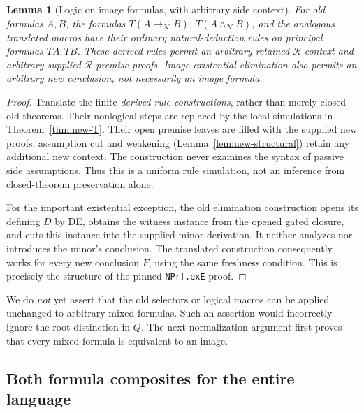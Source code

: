 \documentclass[11pt,a4paper]{article}
\newtheorem{lemma}[theorem]{Lemma}
\theoremstyle{definition}
\begin{document}
\begin{lemma}[Logic on image formulas, with arbitrary side context]
\label{lem:new-image-logic}
For old formulas $A,B$, the formulas
$T(A\to_{\mathcal N}B)$, $T(A\wedge_{\mathcal N}B)$, and the analogous
translated macros have their ordinary natural-deduction rules on principal
formulas $TA,TB$.  These derived rules permit an arbitrary retained
$\mathcal R$ context and arbitrary supplied $\mathcal R$ premise proofs.
Image existential elimination also permits an arbitrary new conclusion,
not necessarily an image formula.
\end{lemma}
\begin{proof}
Translate the finite \emph{derived-rule constructions}, rather than merely
closed old theorems.  Their nonlogical steps are replaced by the local
simulations in Theorem~\ref{thm:new-T}.  Their open premise leaves are filled
with the supplied new proofs; assumption cut and weakening
(Lemma~\ref{lem:new-structural}) retain any additional new context.  The
construction never examines the syntax of passive side assumptions.
Thus this is a uniform rule simulation, not an inference from
closed-theorem preservation alone.

For the important existential exception, the old elimination construction
opens its defining $D$ by DE, obtains the witness instance from the opened
gated closure, and cuts this instance into the supplied minor derivation.
It neither analyzes nor introduces the minor's conclusion.  The translated
construction consequently works for every new conclusion $F$, using the
same freshness condition.  This is precisely the structure of the pinned
\texttt{NPrf.exE} proof.
\end{proof}

We do \emph{not} yet assert that the old selectors or logical macros can be
applied unchanged to arbitrary mixed formulas.  Such an assertion would
incorrectly ignore the root distinction in $Q$.  The next normalization
argument first proves that every mixed formula is equivalent to an image.

\subsection{Both formula composites for the entire language}
\label{subsec:new-composites}
\end{document}
